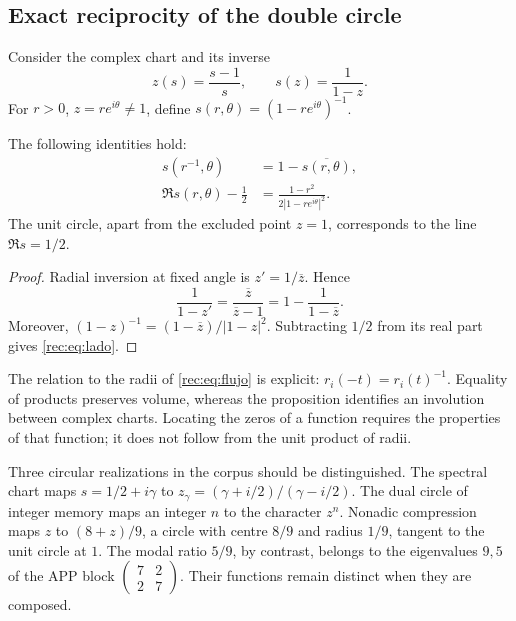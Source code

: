\subsection{Exact reciprocity of the double circle}
\label{rec:doble-circulo}

Consider the complex chart and its inverse
\[
 z(s)=\frac{s-1}{s},\qquad s(z)=\frac1{1-z}.
\]
For \(r>0\), \(z=re^{i\theta}\ne1\), define \(s(r,\theta)=(1-re^{i\theta})^{-1}\).

\begin{proposition}
\label{rec:prop:espejo}
The following identities hold:
\begin{align}
 s(r^{-1},\theta)&=1-\overline{s(r,\theta)},\label{rec:eq:espejo}\\
 \Re s(r,\theta)-\frac12&=
 \frac{1-r^2}{2|1-re^{i\theta}|^2}.\label{rec:eq:lado}
\end{align}
The unit circle, apart from the excluded point \(z=1\), corresponds to the line \(\Re s=1/2\).
\end{proposition}
\begin{proof}
Radial inversion at fixed angle is \(z'=1/\overline z\). Hence
\[
 \frac1{1-z'}=\frac{\overline z}{\overline z-1}
 =1-\frac1{1-\overline z}.
\]
Moreover, \((1-z)^{-1}=(1-\overline z)/|1-z|^2\). Subtracting \(1/2\) from its real part gives \eqref{rec:eq:lado}.
\end{proof}

The relation to the radii of \eqref{rec:eq:flujo} is explicit: \(r_i(-t)=r_i(t)^{-1}\). Equality of products preserves volume, whereas the proposition identifies an involution between complex charts. Locating the zeros of a function requires the properties of that function; it does not follow from the unit product of radii.

Three circular realizations in the corpus should be distinguished. The spectral chart maps \(s=1/2+i\gamma\) to \(z_\gamma=(\gamma+i/2)/(\gamma-i/2)\). The dual circle of integer memory maps an integer \(n\) to the character \(z^n\). Nonadic compression maps \(z\) to \((8+z)/9\), a circle with centre \(8/9\) and radius \(1/9\), tangent to the unit circle at \(1\). The modal ratio \(5/9\), by contrast, belongs to the eigenvalues \(9,5\) of the APP block \(\left(\begin{smallmatrix}7&2\\2&7\end{smallmatrix}\right)\). Their functions remain distinct when they are composed.

